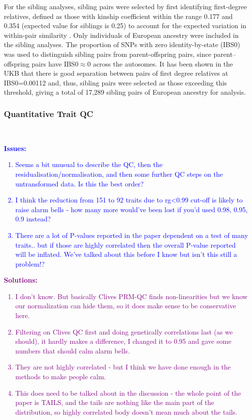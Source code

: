 \documentclass[times]{zHenriquesLab-StyleBioRxiv}
\newcommand\pcomment[1]{\textcolor{blue}{\textbf{Issues:} \footnotesize{#1}}}
\newcommand\tfix[1]{\textcolor{purple}{\textbf{Solutions:} \footnotesize{#1}}}
\begin{document}
For the sibling analyses, sibling pairs were selected by first
identifying first-degree relatives, defined as those with kinship
coefficient within the range 0.177 and 0.354 (expected value for
siblings is 0.25) to account for the expected variation in within-pair
similarity \citep{sib1}. Only individuals of European ancestry were
included in the sibling analyses. The proportion of SNPs with zero
identity-by-state (IBS0) was used to distinguish sibling pairs from
parent-offspring pairs, since parent–offspring pairs have
IBS0$\approx$0 across the autosomes. It has been shown in the UKB that
there is good separation between pairs of first degree relatives at
IBS0=0.00112 \citep{sib1} and, thus, sibling pairs were selected as
those exceeding this threshold, giving a total of 17,289 sibling pairs
of European ancestry for analysis.


\subsubsection*{Quantitative Trait QC} ~\\

\pcomment{
\begin{enumerate} 
\item Seems a bit unusual to describe the QC, then the
  residualisation/normalisation, and then some further QC steps on the
  untransformed data. Is this the best order?
\item I think the reduction from 151 to 92 traits due to rg<0.99
  cut-off is likely to raise alarm bells - how many more would’ve been
  lost if you’d used 0.98, 0.95, 0.9 instead?
\item There are a lot of P-values reported in the paper dependent on a
  test of many traits.. but if those are highly correlated then the
  overall P-value reported will be inflated. We’ve talked about this
  before I know but isn’t this still a problem!?
\end{enumerate} 
}

\tfix{
\begin{enumerate} 
\item I don't know.  But basically Clives PRM-QC finds non-linearities 
    but we know our normalization can hide them, so it does make sense to
    be conservative here. 
\item Filtering on Clives QC first and doing genetically correlations 
last (as we should), it hardly makes a difference, I changed it to 0.95 
and gave some numbers that should calm alarm bells. 
\item They are not highly correlated - but I think we have done 
enough in the methods to make people calm.
\item This does need to be talked about in the discussion - the 
whole point of the paper is TAILS, and the tails are 
nothing like the main part of the distribution, so highly 
correlated body doesn't mean much about the tails. 
\end{enumerate}
}
\end{document}
